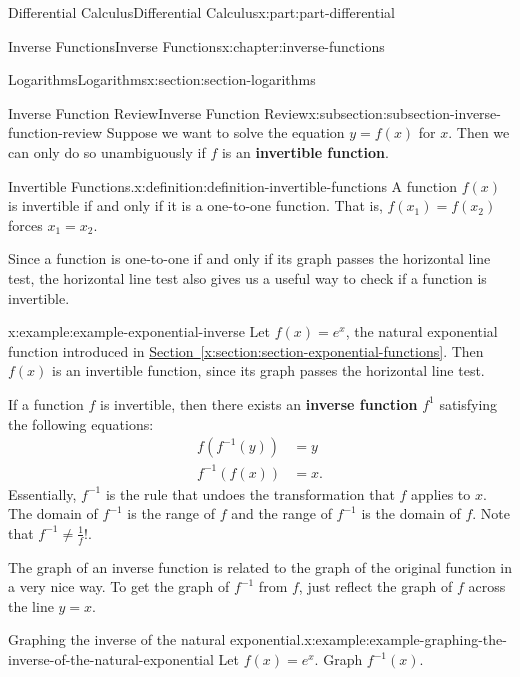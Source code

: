 \documentclass[twoside,10pt,]{book}
\newcommand{\xreffont}{\relax}
\newcommand{\terminology}[1]{\textbf{#1}}
\numberwithin{equation}{part}
\begin{document}
\begin{partptx}{Differential Calculus}{}{Differential Calculus}{}{}{x:part:part-differential}
\begin{chapterptx}{Inverse Functions}{}{Inverse Functions}{}{}{x:chapter:inverse-functions}
%
\begin{sectionptx}{Logarithms}{}{Logarithms}{}{}{x:section:section-logarithms}
%
%
\typeout{************************************************}
\typeout{************************************************}
%
\begin{subsectionptx}{Inverse Function Review}{}{Inverse Function Review}{}{}{x:subsection:subsection-inverse-function-review}
Suppose we want to solve the equation \(y = f(x)\) for \(x\). Then we can only do so unambiguously if \(f\) is an \terminology{invertible function}.%
\begin{definition}{Invertible Functions.}{x:definition:definition-invertible-functions}%
%
A function \(f(x)\) is invertible if and only if it is a one-to-one function. That is, \(f(x_{1}) = f(x_{2})\) forces \(x_{1} = x_{2}\).%
\end{definition}
Since a function is one-to-one if and only if its graph passes the horizontal line test, the horizontal line test also gives us a useful way to check if a function is invertible.%
\begin{example}{}{x:example:example-exponential-inverse}%
Let \(f(x) = e^{x}\), the natural exponential function introduced in \hyperref[x:section:section-exponential-functions]{Section~{\xreffont\ref{x:section:section-exponential-functions}}}. Then \(f(x)\) is an invertible function, since its graph passes the horizontal line test.%
\end{example}
If a function \(f\) is invertible, then there exists an \terminology{inverse function} \(f^{1}\) satisfying the following equations:%
\begin{align*}
f(f^{-1}(y)) & = y \\
f^{-1}(f(x)) & = x. 
\end{align*}
Essentially, \(f^{-1}\) is the rule that undoes the transformation that \(f\) applies to \(x\). The domain of \(f^{-1}\) is the range of \(f\) and the range of \(f^{-1}\) is the domain of \(f\). Note that \(f^{-1}\neq\frac{1}{f}\)!.%
\par
The graph of an inverse function is related to the graph of the original function in a very nice way. To get the graph of \(f^{-1}\) from \(f\), just reflect the graph of \(f\) across the line \(y=x\).%
\begin{example}{Graphing the inverse of the natural exponential.}{x:example:example-graphing-the-inverse-of-the-natural-exponential}%
Let \(f(x) = e^{x}\). Graph \(f^{-1}(x)\).%

\end{example}
\end{subsectionptx}
\end{sectionptx}
\end{chapterptx}
\end{partptx}
\end{document}
